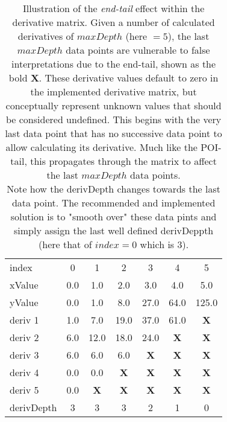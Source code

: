 \documentclass[main.tex]{subfiles}
\begin{document}
  
  \begin{table}[h]
    \centering
    \caption{Illustration of the \textit{end-tail} effect within the derivative matrix. Given a number of calculated derivatives of $maxDepth$ (here $=5$), the last $maxDepth$ data points are vulnerable to false interpretations due to the end-tail, shown as the bold \textbf{X}. These derivative values default to zero in the implemented derivative matrix, but conceptually represent unknown values that should be considered undefined. This begins with the very last data point that has no successive data point to allow calculating its derivative. Much like the POI-tail, this propagates through the matrix to affect the last $maxDepth$ data points.\\
    Note how the derivDepth changes towards the last data point. The recommended and implemented solution is to "smooth over" these data pints and simply assign the last well defined derivDeppth (here that of $index=0$ which is $3$).}
    \begin{tabularx}{0.65\linewidth}{ X | c c c c c c }
      index & 0 & 1 & 2 & 3 & 4 & 5 \\
      xValue & 0.0 & 1.0 & 2.0 & 3.0 & 4.0 & 5.0 \\
      \hline \hline
      yValue & 0.0 & 1.0 & 8.0 & 27.0 & 64.0 & 125.0 \\
      \hline
      deriv 1 & 1.0 & 7.0 & 19.0 & 37.0 & 61.0 & \textbf{X} \\
      deriv 2 & 6.0 & 12.0 & 18.0 & 24.0 & \textbf{X} & \textbf{X} \\
      deriv 3 & 6.0 & 6.0 & 6.0 & \textbf{X} & \textbf{X} & \textbf{X} \\
      deriv 4 & 0.0 & 0.0 & \textbf{X} & \textbf{X} & \textbf{X} & \textbf{X} \\
      deriv 5 & 0.0 & \textbf{X} & \textbf{X} & \textbf{X} & \textbf{X} & \textbf{X} \\
      \hline
      derivDepth & 3  & 3 & 3 & 2 & 1 & 0 \\
    \end{tabularx}
  \label{tbl:mtrx:endError}
  \end{table}
  
\end{document}
